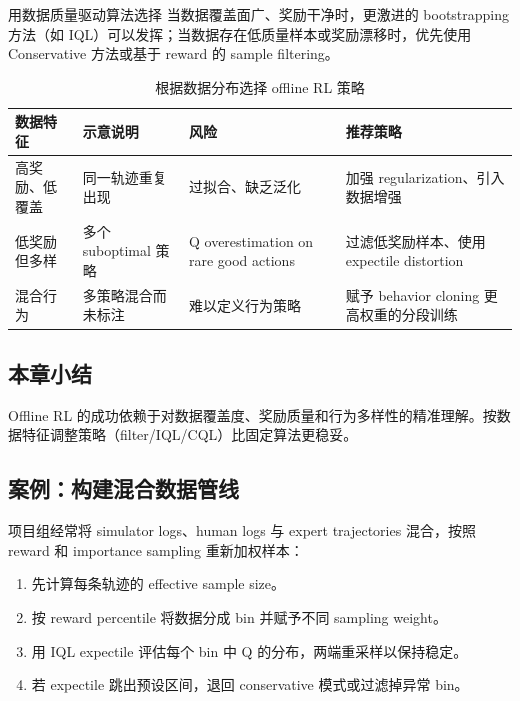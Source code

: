 \documentclass[a4paper]{article}
\begin{document}
\begin{importantbox}{用数据质量驱动算法选择}
当数据覆盖面广、奖励干净时，更激进的 bootstrapping 方法（如 IQL）可以发挥；当数据存在低质量样本或奖励漂移时，优先使用 Conservative 方法或基于 reward 的 sample filtering。
\end{importantbox}

\begin{table}[H]
\centering
\begin{tabular}{p{} p{} p{} p{}}
\toprule
数据特征 & 示意说明 & 风险 & 推荐策略 \\
\midrule
高奖励、低覆盖 & 同一轨迹重复出现 & 过拟合、缺乏泛化 & 加强 regularization、引入数据增强 \\
低奖励但多样 & 多个 suboptimal 策略 & Q overestimation on rare good actions & 过滤低奖励样本、使用 expectile distortion \\
混合行为 & 多策略混合而未标注 & 难以定义行为策略 & 赋予 behavior cloning 更高权重的分段训练 \\
\bottomrule
\end{tabular}
\caption{根据数据分布选择 offline RL 策略}
\end{table}

\subsection{本章小结}

Offline RL 的成功依赖于对数据覆盖度、奖励质量和行为多样性的精准理解。按数据特征调整策略（filter/IQL/CQL）比固定算法更稳妥。

\subsection{案例：构建混合数据管线}

项目组经常将 simulator logs、human logs 与 expert trajectories 混合，按照 reward 和 importance sampling 重新加权样本：

\begin{enumerate}
    \item 先计算每条轨迹的 effective sample size。
    \item 按 reward percentile 将数据分成 bin 并赋予不同 sampling weight。
    \item 用 IQL expectile 评估每个 bin 中 Q 的分布，两端重采样以保持稳定。
    \item 若 expectile 跳出预设区间，退回 conservative 模式或过滤掉异常 bin。
\end{enumerate}
\end{document}
